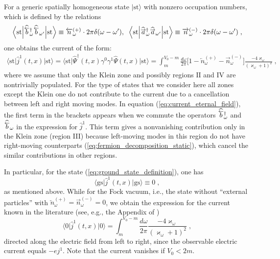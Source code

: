 \documentclass[12pt]{article}
\newcommand\beq{\begin{equation}}
\newcommand\eeq{\end{equation}}
\def\kappaw{\varkappa_{\omega}}
\def\hatbL{\widehat{ \overset{\smash{\raisebox{-0.5ex}{$\scriptstyle\leftarrow$}}}{b} }}
\def\hataR{\widehat{ \overset{\smash{\raisebox{-0.45ex}{$\scriptstyle\rightarrow$}}}{a} }}
\def\w{\omega}
\def\II{\mathrm{II}}
\def\IV{\mathrm{IV}}
\numberwithin{equation}{section}
\begin{document}
For a generic spatially homogeneous state $\Big|\text{st}\Big\rangle$ with nonzero occupation numbers, which is defined by the relations
\beq\label{eq:def_state_non_zero_occupation}
    \Big\langle \text{st}\Big|          \hatbL\phantom{\empty}^{\dagger}_{\w}\hatbL_{\w'}\Big|\text{st}\Big\rangle \equiv \overleftarrow{n}^{(+)}_{\w}\cdot2\pi\delta(\w-\w'),\;\;
     \Big\langle \text{st}\Big|          \hataR\phantom{\empty}^{\dagger}_{\w}\hataR_{\w'}\Big|\text{st}\Big\rangle \equiv \overrightarrow{n}^{(-)}_{\w}\cdot2\pi\delta(\w-\w')\;,
\eeq
one obtains the current of the form:
\beq\label{eq:current_eternal_field}
\begin{aligned}    \Big\langle\text{st}\Big|\widehat{j}^1(t,x)\Big|\text{st}\Big\rangle = \Big\langle\text{st}\Big| \widehat{\mathit{\Psi}}^{\dagger}(t,x)\gamma^0\gamma^1\widehat{\mathit{\Psi}}(t,x)\Big|\text{st}\Big\rangle = \int_{m}^{V_0-m}\frac{d\w}{2\pi}\Big[1-\overleftarrow{n}^{(+)}_{\w}- \overrightarrow{n}^{(-)}_{\w}\Big]\frac{-4\kappaw}{\left(\kappaw+1\right)^2}\;,
\end{aligned}
\eeq
where we assume that only the Klein zone and possibly regions $\II$ and $\IV$ are nontrivially populated. For the type of states that we consider here all zones except the Klein one do not contribute to the current due to a cancellation between left and right moving modes. In equation (\ref{eq:current_eternal_field}), the first term in the brackets appears when we commute the operators $\hatbL\phantom{\empty}^{\dagger}_{\w}$ and $\hatbL\phantom{\empty}_{\w}$ in the expression for $\hat{j}^1$. This term gives a nonvanishing contribution only in the Klein zone (region III) because left-moving modes in this region do not have right-moving counterparts (\ref{eq:fermion_decomposition_static}), which cancel the similar contributions in other regions.

In particular, for the state (\ref{eq:ground_state_definition}), one has 
\beq\label{eq:const_field_gs_current}
\boxed{
\Big\langle\text{gs}\Big|\widehat{j}^1(t,x)\Big|\text{gs}\Big\rangle \equiv 0\;,}
\eeq
as mentioned above. While for the Fock vacuum, i.e., the state without ``external particles'' with $\overleftarrow{n}^{(+)}_{\w} = \overrightarrow{n}^{(-)}_{\w} = 0$, we obtain the expression for the current known in the literature (see, e.g., the Appendix of \cite{Akhmedov:2020dgc})
\beq\label{eq:const_field_fock_vac_current}
\boxed{
\Big\langle0\Big|\widehat{j}^1(t,x)\Big|0\Big\rangle = \int_{m}^{V_0-m}\frac{d\w}{2\pi}\frac{-4\kappaw}{\left(\kappaw+1\right)^2}\;,}
\eeq
directed along the electric field from left to right, since the observable electric current equals $-e j^1$. Note that the current vanishes if $V_0 < 2m$.
\end{document}

